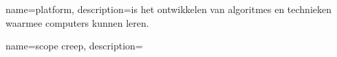 {
    name=platform,
    description={is het ontwikkelen van algoritmes en technieken waarmee computers kunnen leren.}
}

{
    name=scope creep,
    description={}
}